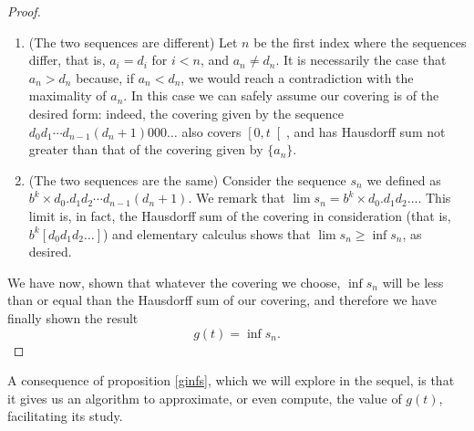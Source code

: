 \documentclass[11pt, reqno]{amsart}
\begin{document}
\begin{proof}
\begin{enumerate}[label=\textbf{Case \arabic*:}]
\item (The two sequences are different) Let $n$ be the first index where the sequences differ, that is, $a_i = d_i$ for $i < n$, and $a_n \neq d_n$. It is necessarily the case that $a_n > d_n$ because, if $a_n < d_n$, we would reach a contradiction with the maximality of $a_n$. In this case we can safely assume our covering is of the desired form: indeed, the covering given by the sequence $d_0 d_1 \cdots d_{n-1} (d_n + 1) 0 0 0 \dots$ also covers $\left[0, t \right[$, and has Hausdorff sum not greater than that of the covering given by $\{a_n\}$.


\item (The two sequences are the same) Consider the sequence $s_n$ we defined as $b^k \times d_0 . d_1 d_2 \cdots d_{n-1} (d_n + 1)$. We remark that $\lim s_n = b^k \times d_0 . d_1 d_2 \dots$. This limit is, in fact, the Hausdorff sum of the covering in consideration (that is, $b^k [d_0 d_1 d_2 \dots]$) and elementary calculus shows that $\lim s_n \geq \inf s_n$, as desired.
\end{enumerate}

We have now, shown that whatever the covering we choose, $\inf s_n$ will be less than or equal than the Hausdorff sum of our covering, and therefore we have finally shown the result
\[ g(t) = \inf s_n.\]

\iffalse
Now, to show we can assume all intervals to be disjoint: fix any point $a$ in $\cup I_i$. Define $J_a$ to be \emph{the biggest interval in $A$ containing $a$}. We propose, now, that the covering $A' = \{ J_a \}$ covers exactly the same points as $A$, while having a Hausdorff sum less than or equal to that of $A$, as well as having all its intervals be disjoint.

The first two properties are trivial, so we devote our attention only to the third one: suppose, for the sake of argument, that $J_a$ and $J_b$ are not disjoint. The structure of the $b$-ary intervals mandates that either $J_a \subseteq J_b$ or $J_b \subseteq J_a$; suppose the former for the sake of argument. Then, $a \in J_b$, which implies $J_a$ is of length greater than or equal to that of $J_b$ (by definition), and so, in fact, $J_a = J_b$.

This digression completed, we may go back to the problem at hand.
\fi
\end{proof}

A consequence of proposition \ref{ginfs}, which we will explore in the sequel, is that it gives us an algorithm to approximate, or even compute, the value of $g(t)$, facilitating its study.
\end{document}
